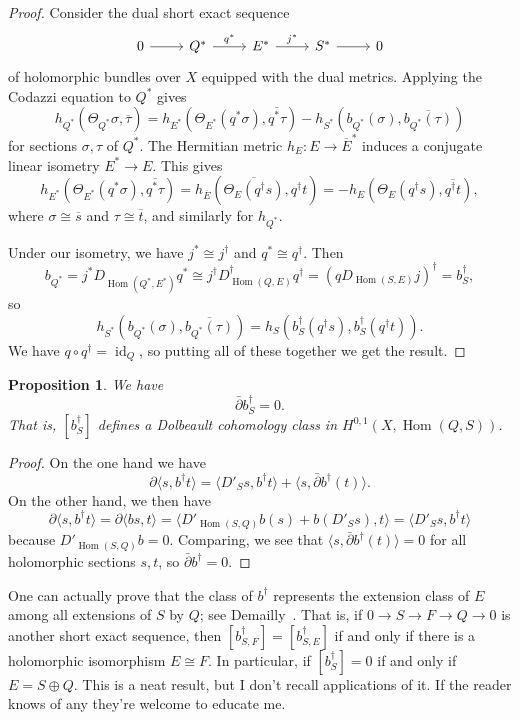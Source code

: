 \documentclass[10pt,a4paper]{article}
\newtheorem{prop}[theo]{Proposition}
\newtheorem*{proof}{Proof}
\def\ov#1{\overline{#1}}
\DeclareMathOperator{\Hom}{Hom}
\DeclareMathOperator{\id}{id}
\begin{document}
\begin{proof}
Consider the dual short exact sequence
\[
\begin{tikzcd}
0 \arrow[r] & Q^* \arrow[r,"q^*"] & E^* \arrow[r,"j^*"]  & S^* \arrow[r] & 0
\end{tikzcd}
\]
of holomorphic bundles over $X$ equipped with the dual metrics.
Applying the Codazzi equation to $Q^*$ gives
$$
h_{Q^*}(\Theta_{Q^*} \sigma, \ov \tau)
= h_{E^*}(\Theta_{E^*} (q^* \sigma),\ov{ q^* \tau})
- h_{S^*}(b_{Q^*}(\sigma), \ov{b_{Q^*}(\tau)})
$$
for sections $\sigma,\tau$ of $Q^*$. The Hermitian metric $h_E : E \to \ov E^*$ induces a conjugate linear isometry $E^* \to E$. This gives
\[
h_{E^*}(\Theta_{E^*} (q^* \sigma),\ov{ q^* \tau})
= h_{\ov E}(\ov{\Theta_{E} (q^\dagger s)}, q^\dagger t)
= -h_{E}(\Theta_{E} (q^\dagger s), \ov{q^\dagger t}),
\]
where $\sigma \cong \ov s$ and $\tau \cong \ov t$,
and similarly for $h_{Q^*}$.

Under our isometry, we have $j^* \cong j^\dagger$ and $q^* \cong q^\dagger$. Then
\[
b_{Q^*}
= j^*D_{\Hom(Q^*,E^*)}q^*
\cong j^\dagger D_{\Hom(Q,E)}^\dagger q^\dagger
= (q D_{\Hom(S,E)} j)^\dagger
= b_S^\dagger,
\]
so
\[
h_{S^*}(b_{Q^*}(\sigma), \ov{b_{Q^*}(\tau)})
= h_{S}(b_S^\dagger(q^\dagger s), b_S^\dagger(q^\dagger t)).
\]
We have $q \circ q^\dagger = \id_Q$, so putting all of these together we get the result.
\end{proof}



\begin{prop}
We have
\[
\bar\partial b_S^\dagger = 0.
\]
That is, $[b_S^\dagger]$ defines a Dolbeault cohomology class in $H^{0,1}(X, \Hom(Q,S))$.
\end{prop}

\begin{proof}
On the one hand we have
\[
\partial \langle s, b^\dagger t \rangle
= \langle D'_Ss, b^\dagger t \rangle
+ \langle s, \bar\partial b^\dagger (t) \rangle.
\]
On the other hand, we then have
\[
\partial \langle s, b^\dagger t \rangle
= \partial \langle b s, t \rangle
= \langle D'_{\Hom(S,Q)}b (s) + b(D'_Ss), t \rangle
= \langle D'_Ss, b^\dagger t \rangle
\]
because $D'_{\Hom(S,Q)}b = 0$.
Comparing, we see that $\langle s, \bar\partial b^\dagger (t) \rangle = 0$ for all holomorphic sections $s,t$, so $\bar\partial b^\dagger = 0$.
\end{proof}


One can actually prove that the class of $b^\dagger$ represents the extension class of $E$ among all extensions of $S$ by $Q$; see Demailly~\cite[Proposition~14.9]{demailly-complex}. That is, if $0 \to S \to F \to Q \to 0$ is another short exact sequence, then $[b_{S,F}^\dagger] = [b_{S,E}^\dagger]$ if and only if there is a holomorphic isomorphism $E \cong F$. In particular, if $[b_S^\dagger] = 0$ if and only if $E = S \oplus Q$. This is a neat result, but I don't recall applications of it. If the reader knows of any they're welcome to educate me.
\end{document}
